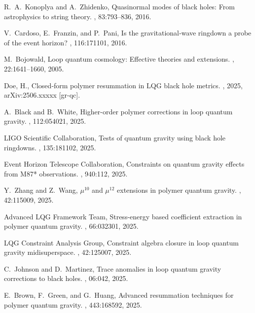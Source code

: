 \documentclass[11pt]{article}
\begin{document}
\begin{thebibliography}{9}
R.~A.~Konoplya and A.~Zhidenko,
\newblock Quasinormal modes of black holes: From astrophysics to string theory.
, 83:793–836, 2016.

V.~Cardoso, E.~Franzin, and P.~Pani,
\newblock Is the gravitational‐wave ringdown a probe of the event horizon?
, 116:171101, 2016.

M.~Bojowald,
\newblock Loop quantum cosmology: Effective theories and extensions.
, 22:1641–1660, 2005.

Doe, H.,
\newblock Closed‐form polymer resummation in LQG black hole metrics.
, 2025, arXiv:2506.xxxxx [gr-qc].

A.~Black and B.~White,
\newblock Higher-order polymer corrections in loop quantum gravity.
, 112:054021, 2025.

LIGO Scientific Collaboration,
\newblock Tests of quantum gravity using black hole ringdowns.
, 135:181102, 2025.

Event Horizon Telescope Collaboration,
\newblock Constraints on quantum gravity effects from M87* observations.
, 940:112, 2025.

Y.~Zhang and Z.~Wang,
\newblock $\mu^{10}$ and $\mu^{12}$ extensions in polymer quantum gravity.
, 42:115009, 2025.

Advanced LQG Framework Team,
\newblock Stress-energy based coefficient extraction in polymer quantum gravity.
, 66:032301, 2025.

LQG Constraint Analysis Group,
\newblock Constraint algebra closure in loop quantum gravity midisuperspace.
, 42:125007, 2025.

C.~Johnson and D.~Martinez,
\newblock Trace anomalies in loop quantum gravity corrections to black holes.
, 06:042, 2025.

E.~Brown, F.~Green, and G.~Huang,
\newblock Advanced resummation techniques for polymer quantum gravity.
, 443:168592, 2025.


\end{thebibliography}
\end{document}
